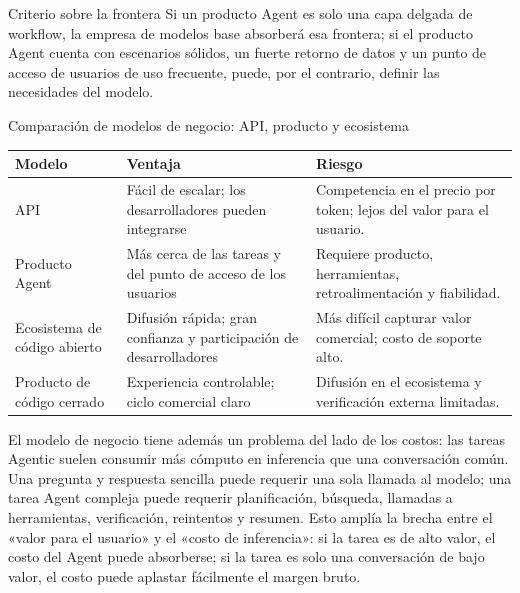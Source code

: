 \documentclass[a4paper]{article}
\begin{document}
\begin{importantbox}{Criterio sobre la frontera}
Si un producto Agent es solo una capa delgada de workflow, la empresa de modelos base absorberá esa frontera; si el producto Agent cuenta con escenarios sólidos, un fuerte retorno de datos y un punto de acceso de usuarios de uso frecuente, puede, por el contrario, definir las necesidades del modelo.
\end{importantbox}

\begin{knowledgebox}{Comparación de modelos de negocio: API, producto y ecosistema}
\begin{tabularx}{\textwidth}{p{}p{}X}
\toprule
Modelo & Ventaja & Riesgo \\
\midrule
API & Fácil de escalar; los desarrolladores pueden integrarse & Competencia en el precio por token; lejos del valor para el usuario. \\
Producto Agent & Más cerca de las tareas y del punto de acceso de los usuarios & Requiere producto, herramientas, retroalimentación y fiabilidad. \\
Ecosistema de código abierto & Difusión rápida; gran confianza y participación de desarrolladores & Más difícil capturar valor comercial; costo de soporte alto. \\
Producto de código cerrado & Experiencia controlable; ciclo comercial claro & Difusión en el ecosistema y verificación externa limitadas. \\
\bottomrule
\end{tabularx}
\end{knowledgebox}

El modelo de negocio tiene además un problema del lado de los costos: las tareas Agentic suelen consumir más cómputo en inferencia que una conversación común. Una pregunta y respuesta sencilla puede requerir una sola llamada al modelo; una tarea Agent compleja puede requerir planificación, búsqueda, llamadas a herramientas, verificación, reintentos y resumen. Esto amplía la brecha entre el «valor para el usuario» y el «costo de inferencia»: si la tarea es de alto valor, el costo del Agent puede absorberse; si la tarea es solo una conversación de bajo valor, el costo puede aplastar fácilmente el margen bruto.
\end{document}
